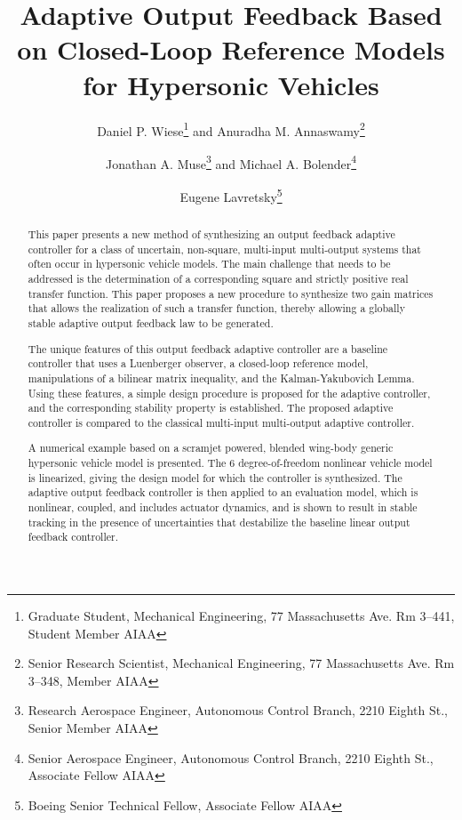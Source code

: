 \documentclass[]{../sty/JGCD}
\theoremstyle{examplestyle}
\begin{document}
  \title{Adaptive Output Feedback Based on Closed-Loop Reference Models for Hypersonic Vehicles}

  \author{Daniel P. Wiese\footnote{Graduate Student, Mechanical Engineering, 77 Massachusetts Ave. Rm 3--441, Student Member AIAA} and Anuradha M. Annaswamy\footnote{Senior Research Scientist, Mechanical Engineering, 77 Massachusetts Ave. Rm 3--348, Member AIAA}}
  \author{Jonathan A. Muse\footnote{Research Aerospace Engineer, Autonomous Control Branch, 2210 Eighth St., Senior Member AIAA} and Michael A. Bolender\footnote{Senior Aerospace Engineer, Autonomous Control Branch, 2210 Eighth St., Associate Fellow AIAA}}
  \author{Eugene Lavretsky\footnote{Boeing Senior Technical Fellow, Associate Fellow AIAA}}

  \begin{abstract}
    This paper presents a new method of synthesizing an output feedback adaptive controller for a class of uncertain, non-square, multi-input multi-output systems that often occur in hypersonic vehicle models.
    The main challenge that needs to be addressed is the determination of a corresponding square and strictly positive real transfer function.
    This paper proposes a new procedure to synthesize two gain matrices that allows the realization of such a transfer function, thereby allowing a globally stable adaptive output feedback law to be generated.

    The unique features of this output feedback adaptive controller are a baseline controller that uses a Luenberger observer, a closed-loop reference model, manipulations of a bilinear matrix inequality, and the Kalman-Yakubovich Lemma.
    Using these features, a simple design procedure is proposed for the adaptive controller, and the corresponding stability property is established.
    The proposed adaptive controller is compared to the classical multi-input multi-output adaptive controller.

    A numerical example based on a scramjet powered, blended wing-body generic hypersonic vehicle model is presented.
    The 6 degree-of-freedom nonlinear vehicle model is linearized, giving the design model for which the controller is synthesized.
    The adaptive output feedback controller is then applied to an evaluation model, which is nonlinear, coupled, and includes actuator dynamics, and is shown to result in stable tracking in the presence of uncertainties that destabilize the baseline linear output feedback controller.
  \end{abstract}
\end{document}
